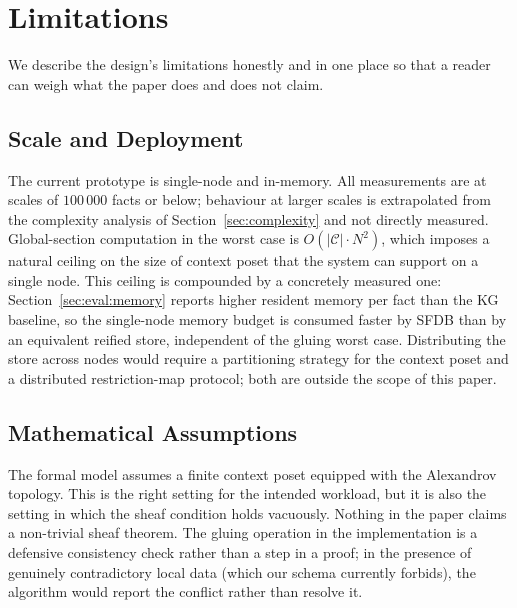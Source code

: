 \section{Limitations}
\label{sec:limitations}

We describe the design's limitations honestly and in one place so that a
reader can weigh what the paper does and does not claim.

\subsection{Scale and Deployment}
\label{sec:limits:scalability}

The current prototype is single-node and in-memory. All measurements are at
scales of $100\,000$ facts or below; behaviour at larger scales is
extrapolated from the complexity analysis of Section~\ref{sec:complexity}
and not directly measured. Global-section computation in the worst case is
$O(|\mathcal{C}| \cdot N^2)$, which imposes a natural ceiling on the size
of context poset that the system can support on a single node. This
ceiling is compounded by a concretely measured one: Section~\ref{sec:eval:memory}
reports \rangememkg{} higher resident memory per fact than the KG
baseline, so the single-node memory budget is consumed faster by SFDB than
by an equivalent reified store, independent of the gluing worst case.
Distributing the store across nodes would require a partitioning strategy
for the context poset and a distributed restriction-map protocol; both are
outside the scope of this paper.

\subsection{Mathematical Assumptions}
\label{sec:limits:math}

The formal model assumes a finite context poset equipped with the
Alexandrov topology. This is the right setting for the intended workload,
but it is also the setting in which the sheaf condition holds vacuously.
Nothing in the paper claims a non-trivial sheaf theorem. The gluing
operation in the implementation is a defensive consistency check rather
than a step in a proof; in the presence of genuinely contradictory local
data (which our schema currently forbids), the algorithm would report the
conflict rather than resolve it.

